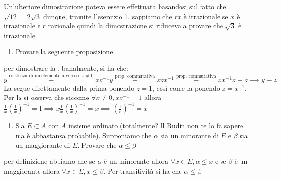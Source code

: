 \documentclass{report}
\begin{document}
		Un'ulteriore dimostrazione poteva essere effettuata basandosi sul fatto che $\sqrt{12} = 2\sqrt{3}$ dunque, tramite l'esercizio 1, sappiamo che $rx$ è irrazionale se $x$ è irrazionale e $r$ razionale quindi la dimostrazione si riduceva a provare che $\sqrt{3}$ è irrazionale.
\begin{enumerate}[resume, label=\protect\circled{\arabic*}]
		\item Provare la seguente proposizione
\end{enumerate}		
	\begin{mysolution}
	per dimostrare la , banalmente, si ha che:
	$$
	y \stackrel{\text{esistenza di un elemento inverso e } x \neq 0}{=}  x x^{-1} y \stackrel{\text{prop. commutativa}}{=} xz x^{-1} \stackrel{\text{prop. commutativa}}{=} x x^{-1} z = z \implies y=z
	$$
	La  segue direttamente dalla prima ponendo $z=1$, così come la  ponendo $z=x^{-1}$. Per la  si osserva che siccome $\forall x \neq 0, x x^{-1} = 1$ allora $\frac{1}{x} (\frac{1}{x})^{-1} = 1 \implies x \frac{1}{x} (\frac{1}{x})^{-1} = x \implies (\frac{1}{x})^{-1} = x$
	\end{mysolution}
\begin{enumerate}[resume, label=\protect\circled{\arabic*}]
	\item Sia $E \subset A$ con $A$ insieme ordinato (totalmente? Il Rudin non ce lo fa sapere ma è abbastanza probabile). Supponiamo che $\alpha$ sia un minorante di $E$ e $\beta$ sia un maggiorante di $E$. Provare che $\alpha \leq \beta$
\end{enumerate}
\begin{mysolution}
	per definizione abbiamo che se $\alpha$ è un minorante allora $\forall x \in E, \alpha \leq x$ e se $\beta$ è un maggiorante allora $\forall x \in E, x \leq \beta$. Per transitività si ha che $\alpha \leq \beta$
\end{mysolution}
\end{document}
